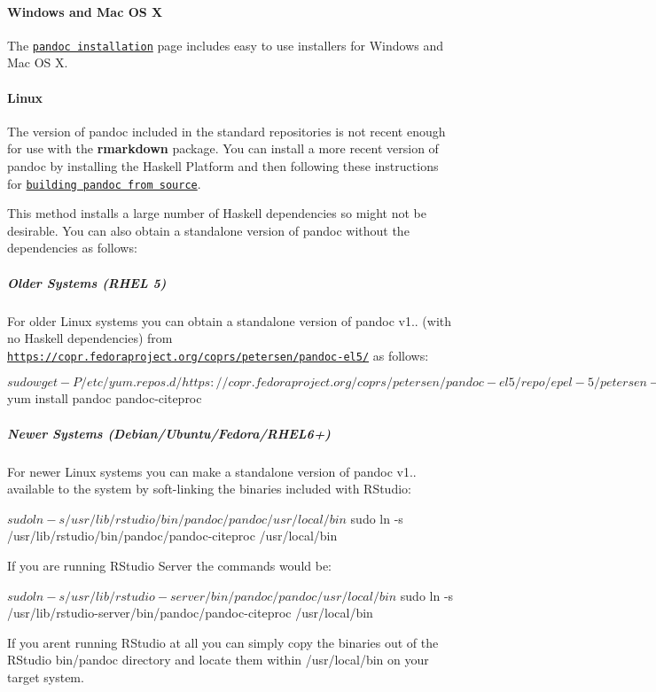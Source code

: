 \paragraph*{Windows and Mac OS X}

The \href{http://johnmacfarlane.net/pandoc/installing.html}{\tt pandoc installation} page includes easy to use installers for Windows and Mac OS X.

\paragraph*{Linux}

The version of pandoc included in the standard repositories is not recent enough for use with the {\bfseries rmarkdown} package. You can install a more recent version of pandoc by installing the Haskell Platform and then following these instructions for \href{http://johnmacfarlane.net/pandoc/installing.html#all-platforms}{\tt building pandoc from source}.

This method installs a large number of Haskell dependencies so might not be desirable. You can also obtain a standalone version of pandoc without the dependencies as follows\+:

\subparagraph*{Older Systems (R\+H\+EL 5)}

For older Linux systems you can obtain a standalone version of pandoc v1.. (with no Haskell dependencies) from \href{https://copr.fedoraproject.org/coprs/petersen/pandoc-el5/}{\tt https\+://copr.\+fedoraproject.\+org/coprs/petersen/pandoc-\/el5/} as follows\+: \begin{DoxyVerb}$ sudo wget -P /etc/yum.repos.d/ https://copr.fedoraproject.org/coprs/petersen/pandoc-el5/repo/epel-5/petersen-pandoc-el5-epel-5.repo
$ yum install pandoc pandoc-citeproc
\end{DoxyVerb}


\subparagraph*{Newer Systems (Debian/\+Ubuntu/\+Fedora/\+R\+H\+E\+L6+)}

For newer Linux systems you can make a standalone version of pandoc v1.. available to the system by soft-\/linking the binaries included with R\+Studio\+: \begin{DoxyVerb}$ sudo ln -s /usr/lib/rstudio/bin/pandoc/pandoc /usr/local/bin
$ sudo ln -s /usr/lib/rstudio/bin/pandoc/pandoc-citeproc /usr/local/bin
\end{DoxyVerb}


If you are running R\+Studio Server the commands would be\+: \begin{DoxyVerb}$ sudo ln -s /usr/lib/rstudio-server/bin/pandoc/pandoc /usr/local/bin
$ sudo ln -s /usr/lib/rstudio-server/bin/pandoc/pandoc-citeproc /usr/local/bin
\end{DoxyVerb}


If you aren\textquotesingle{}t running R\+Studio at all you can simply copy the binaries out of the R\+Studio {\ttfamily bin/pandoc} directory and locate them within {\ttfamily /usr/local/bin} on your target system. 